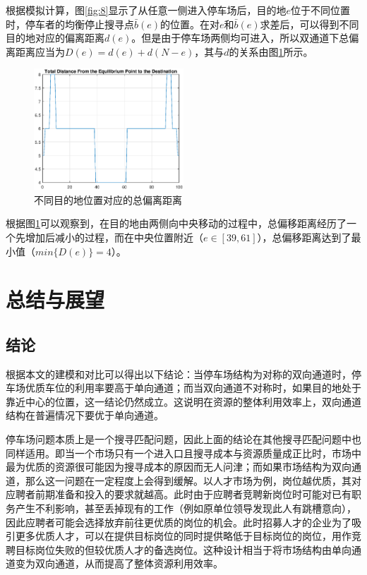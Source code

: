 \documentclass{thuemp}
\begin{document}
\par 根据模拟计算，图\ref{fig:8}显示了从任意一侧进入停车场后，目的地$e$位于不同位置时，停车者的均衡停止搜寻点$\bar{b}(e)$的位置。在对$e$和$\bar{b}(e)$求差后，可以得到不同目的地对应的偏离距离$d(e)$。但是由于停车场两侧均可进入，所以双通道下总偏离距离应当为$D(e)=d(e)+d(N-e)$，其与$d$的关系由图\ref{fig:9}所示。

\begin{figure}[H]
    \centering
    \includegraphics[width=0.5\textwidth]{asymmetric_dstnc_to_e.eps}
    \caption{不同目的地位置对应的总偏离距离}
    \label{fig:9}
\end{figure}

\par 根据图\ref{fig:9}可以观察到，在目的地由两侧向中央移动的过程中，总偏移距离经历了一个先增加后减小的过程，而在中央位置附近（$e\in[39,61]$），总偏移距离达到了最小值（$min\{D(e)\}=4$）。




\section{总结与展望}
\subsection{结论}
\par 根据本文的建模和对比可以得出以下结论：当停车场结构为对称的双向通道时，停车场优质车位的利用率要高于单向通道；而当双向通道不对称时，如果目的地处于靠近中心的位置，这一结论仍然成立。这说明在资源的整体利用效率上，双向通道结构在普遍情况下要优于单向通道。
\par 停车场问题本质上是一个搜寻匹配问题，因此上面的结论在其他搜寻匹配问题中也同样适用。即当一个市场只有一个进入口且搜寻成本与资源质量成正比时，市场中最为优质的资源很可能因为搜寻成本的原因而无人问津；而如果市场结构为双向通道，那么这一问题在一定程度上会得到缓解。以人才市场为例，岗位越优质，其对应聘者前期准备和投入的要求就越高。此时由于应聘者竞聘新岗位时可能对已有职务产生不利影响，甚至丢掉现有的工作（例如原单位领导发现此人有跳槽意向），因此应聘者可能会选择放弃前往更优质的岗位的机会。此时招募人才的企业为了吸引更多优质人才，可以在提供目标岗位的同时提供略低于目标岗位的岗位，用作竞聘目标岗位失败的但较优质人才的备选岗位。这种设计相当于将市场结构由单向通道变为双向通道，从而提高了整体资源利用效率。
\end{document}
